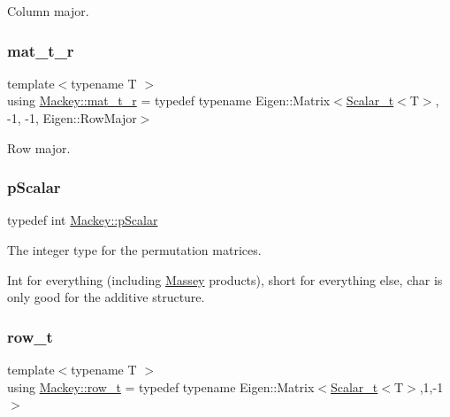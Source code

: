 Column major. 

\mbox{\label{namespaceMackey_ac1c9f85957dda772ceaa564cb23494cb}} 
\subsubsection{\texorpdfstring{mat\+\_\+t\+\_\+r}{mat\_t\_r}}
{\footnotesize\ttfamily template$<$typename T $>$ \\
using \hyperlink{namespaceMackey_ac1c9f85957dda772ceaa564cb23494cb}{Mackey\+::mat\+\_\+t\+\_\+r} = typedef typename Eigen\+::\+Matrix$<$\hyperlink{namespaceMackey_a93ba297573961f91101fb84bc84bbe95}{Scalar\+\_\+t}$<$T$>$, -\/1, -\/1, Eigen\+::\+Row\+Major$>$}



Row major. 

\mbox{\label{namespaceMackey_a4f147e328c520f568f5d3adf1c75f514}} 
\subsubsection{\texorpdfstring{p\+Scalar}{pScalar}}
{\footnotesize\ttfamily typedef int \hyperlink{namespaceMackey_a4f147e328c520f568f5d3adf1c75f514}{Mackey\+::p\+Scalar}}

The integer type for the permutation matrices.

Int for everything (including \hyperlink{classMackey_1_1Massey}{Massey} products), short for everything else, char is only good for the additive structure. \mbox{\label{namespaceMackey_a6d37801553e585770ca7d1243ab3b213}} 
\subsubsection{\texorpdfstring{row\+\_\+t}{row\_t}}
{\footnotesize\ttfamily template$<$typename T $>$ \\
using \hyperlink{namespaceMackey_a6d37801553e585770ca7d1243ab3b213}{Mackey\+::row\+\_\+t} = typedef typename Eigen\+::\+Matrix$<$\hyperlink{namespaceMackey_a93ba297573961f91101fb84bc84bbe95}{Scalar\+\_\+t}$<$T$>$,1,-\/1$>$}



